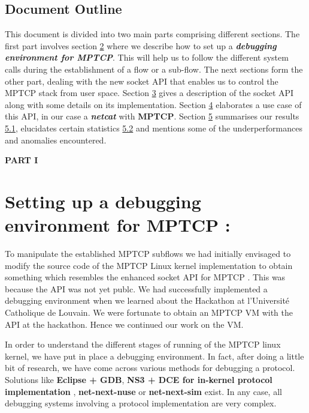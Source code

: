 \documentclass[a4paper,11pt]{article}
\begin{document}
		\clearpage
		\subsection{Document Outline}
			\begin{description}
				\item \hspace{2cm} This document is divided into two main parts comprising different sections. The first part involves section \hyperref[sec:mptcpdebug]{2} where we describe how to set up a \textbf{\emph{debugging environment for MPTCP}}. This will help us to follow the different system calls during the establishment of a flow or a sub-flow. The next sections form the other part, dealing with the new socket API that enables us to control the MPTCP stack from user space. Section \hyperref[sec:mptcpapi]{3} gives a description of the socket API along with some details on its implementation. Section \hyperref[sec:netcat-mptcp]{4} elaborates a use case of this API, in our case a \textbf{\emph{netcat}} with \textbf{MPTCP}. Section \hyperref[sec:res]{5} summarises our results \hyperref[subsec:result]{5.1}, elucidates certain statistics \hyperref[subsec:statistics]{5.2} and mentions some of the underperformances and anomalies encountered.
			\end{description}



	\vspace*{1.5cm}

	\begin{center}
		\LARGE\textbf{PART I}
	\end{center}


	\section{Setting up a debugging environment for MPTCP : }

		\label{sec:mptcpdebug}
		To manipulate the established MPTCP subflows we had initially envisaged to modify the source code of the MPTCP Linux kernel implementation to obtain something which resembles the enhanced socket API for MPTCP \cite[API]{api}. This was because the API was not yet publc. We had successfully implemented a debugging environment when we learned about the Hackathon \cite[hackathon]{ucl} at l'Université Catholique de Louvain. We were fortunate to obtain an MPTCP VM with the API at the hackathon. Hence we continued our work on the VM.

		In order to understand the different stages of running of the MPTCP linux kernel, we have put in place a debugging environment. In fact, after doing a little bit of research, we have come across various methods for debugging a protocol. Solutions like \textbf{Eclipse + GDB}, \textbf{NS3 + DCE for in-kernel protocol implementation} \cite[NS3+DCE]{inkernel}, \textbf{net-next-nuse} \cite[net-next-nuse]{net-next-nuse} or \textbf{net-next-sim} \cite[net-next-sim]{net-next-sim} exist. In any case, all debugging systems involving a protocol implementation are very complex. \\
\end{document}
